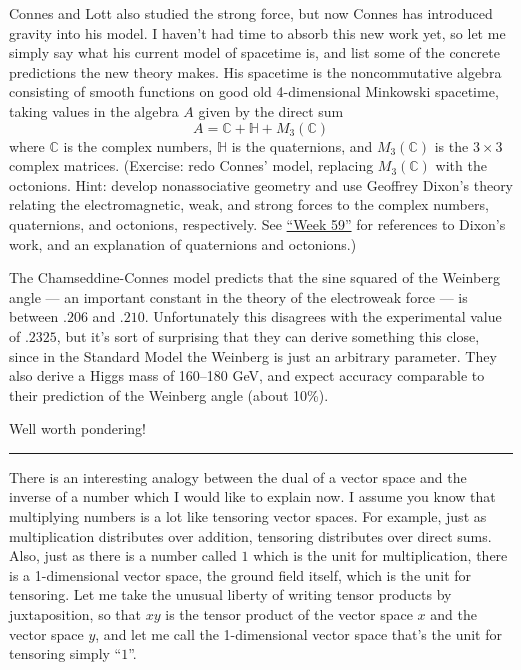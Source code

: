 \documentclass{article}
\begin{document}
Connes and Lott also studied the strong force, but now Connes has
introduced gravity into his model. I haven't had time to absorb this new
work yet, so let me simply say what his current model of spacetime is,
and list some of the concrete predictions the new theory makes. His
spacetime is the noncommutative algebra consisting of smooth functions
on good old 4-dimensional Minkowski spacetime, taking values in the
algebra \(A\) given by the direct sum
\[A = \mathbb{C} + \mathbb{H} + M_3(\mathbb{C})\] where \(\mathbb{C}\)
is the complex numbers, \(\mathbb{H}\) is the quaternions, and
\(M_3(\mathbb{C})\) is the \(3\times3\) complex matrices. (Exercise:
redo Connes' model, replacing \(M_3(\mathbb{C})\) with the octonions.
Hint: develop nonassociative geometry and use Geoffrey Dixon's theory
relating the electromagnetic, weak, and strong forces to the complex
numbers, quaternions, and octonions, respectively. See
\protect\hyperlink{week59}{``Week 59''} for references to Dixon's work,
and an explanation of quaternions and octonions.)

The Chamseddine-Connes model predicts that the sine squared of the
Weinberg angle --- an important constant in the theory of the
electroweak force --- is between \(.206\) and \(.210\). Unfortunately
this disagrees with the experimental value of \(.2325\), but it's sort
of surprising that they can derive something this close, since in the
Standard Model the Weinberg is just an arbitrary parameter. They also
derive a Higgs mass of 160--180 GeV, and expect accuracy comparable to
their prediction of the Weinberg angle (about 10\%).

Well worth pondering!

\begin{center}\rule{0.5\linewidth}{0.5pt}\end{center}

There is an interesting analogy between the dual of a vector space and
the inverse of a number which I would like to explain now. I assume you
know that multiplying numbers is a lot like tensoring vector spaces. For
example, just as multiplication distributes over addition, tensoring
distributes over direct sums. Also, just as there is a number called
\(1\) which is the unit for multiplication, there is a 1-dimensional
vector space, the ground field itself, which is the unit for tensoring.
Let me take the unusual liberty of writing tensor products by
juxtaposition, so that \(xy\) is the tensor product of the vector space
\(x\) and the vector space \(y\), and let me call the 1-dimensional
vector space that's the unit for tensoring simply ``\(1\)''.
\end{document}
